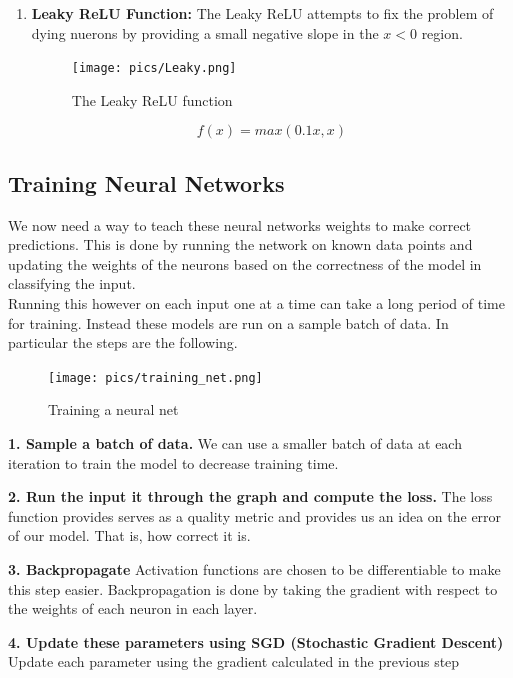 \documentclass[twoside]{article}
\begin{document}
\begin{enumerate}
\item \textbf{Leaky ReLU Function:}
The Leaky ReLU attempts to fix the problem of dying nuerons by providing a small negative slope in the $x<0$ region.
\begin{figure}[!htb]
\centering
\texttt{[image: pics/Leaky.png]}
\caption{The Leaky ReLU function\cite{cs231n-website}}
\label{fig:ReLU}
\end{figure}
\begin{equation*}
f(x) = max( 0.1 x, x )
\end{equation*}

\end{enumerate}
\subsection{Training Neural Networks}
We now need a way to teach these neural networks weights to make correct predictions. This is done by running the network on known data points and updating the weights of the neurons based on the correctness of the model in classifying the input. \\

Running this however on each input one at a time can take a long period of time for training. Instead these models are run on a sample batch of data. In particular the steps are the following.\\

\begin{figure}[!htb]
\centering
\texttt{[image: pics/training\_net.png]}
\caption{Training a neural net\cite{}}
\label{fig:Training a neural net}
\end{figure}

\textbf{1. Sample a batch of data.}
We can use a smaller batch of data at each iteration to train the model to decrease training time.

\textbf{2. Run the input it through the graph and compute the loss.}
The loss function provides serves as a quality metric and provides us an idea on the error of our model. That is, how correct it is.

\textbf{3. Backpropagate}
Activation functions are chosen to be differentiable to make this step easier. Backpropagation is done by taking the gradient with respect to the weights of each neuron in each layer.

\textbf{4. Update these parameters using SGD (Stochastic Gradient Descent)}
Update each parameter using the gradient calculated in the previous step
\end{document}

